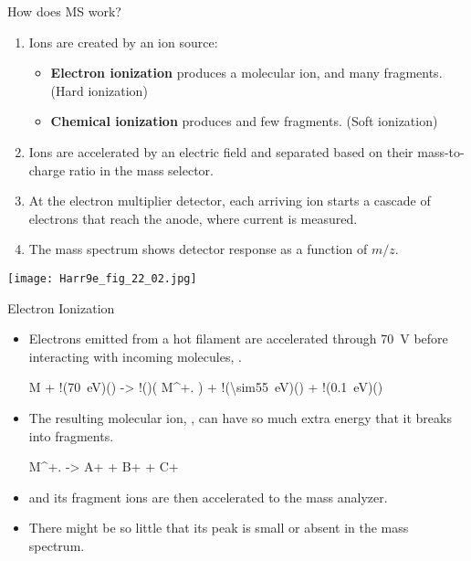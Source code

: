 \documentclass[handout]{beamer}
\begin{document}
\begin{frame}[allowframebreaks]{How does MS work?}
	\begin{enumerate}
		\item Ions are created by an \alert{ion source}:
			\begin{itemize}
				\item \textbf{Electron ionization} produces a
					molecular ion,  and many
					\alert{fragments}. (Hard ionization)
				\item \textbf{Chemical ionization} produces
					 and few \alert{fragments}.
					(Soft ionization)
			\end{itemize}
		\item Ions are accelerated by an electric field and separated
			based on their mass-to-charge ratio in the \alert{mass
			selector}.
		\item At the \alert{electron multiplier detector}, each arriving
			ion starts a cascade of electrons that reach the anode,
			where current is measured.
		\item The \alert{mass spectrum} shows detector response as a
			function of $m/z$.
	\end{enumerate}

	\framebreak

	\begin{center}
		\texttt{[image: Harr9e\_fig\_22\_02.jpg]}
	\end{center}
\end{frame}

\begin{frame}{Electron Ionization}
	\begin{itemize}
		\item Electrons emitted from a hot filament are accelerated
			through \SI{70}{\volt} before interacting with incoming
			molecules, .
			\begin{reaction*}
				M + !(\SI{70}{eV})(\el{})
				-> !()( M^{+.} )
				+ !(\SI{\sim55}{eV})(\el{})
				+ !(\SI{0.1}{eV})(\el{})
			\end{reaction*}
		\item The resulting molecular ion, , can have so much
			extra energy that it breaks into fragments.
			\begin{reaction*}
				M^{+.} -> A+ + B+ + C+
			\end{reaction*}
		\item {} and its fragment ions are then accelerated to
			the mass analyzer.
		\item There might be so little  that its peak is
			small or absent in the mass spectrum.
	\end{itemize}
\end{frame}
\end{document}
